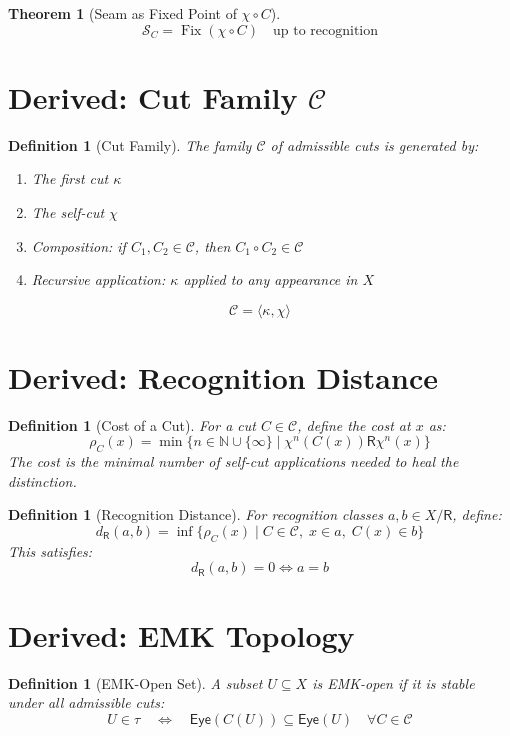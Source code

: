 \documentclass[12pt]{article}
\newtheorem{definition}[axiom]{Definition}
\newtheorem{theorem}[axiom]{Theorem}
\newcommand{\cut}{\kappa}
\newcommand{\selfcut}{\chi}
\newcommand{\seam}{\mathcal{S}}
\newcommand{\eye}{\mathsf{Eye}}
\newcommand{\rec}{\mathsf{R}}
\newcommand{\cost}{\rho}
\newcommand{\dist}{d_{\rec}}
\DeclareMathOperator{\Fix}{Fix}
\begin{document}
\begin{theorem}[Seam as Fixed Point of $\selfcut \circ C$]
\[
\seam_C = \Fix(\selfcut \circ C) \quad \text{up to recognition}
\]
\end{theorem}

\section{Derived: Cut Family $\mathcal{C}$}

\begin{definition}[Cut Family]
The family $\mathcal{C}$ of admissible cuts is generated by:
\begin{enumerate}
    \item The first cut $\cut$
    \item The self-cut $\selfcut$
    \item Composition: if $C_1, C_2 \in \mathcal{C}$, then $C_1 \circ C_2 \in \mathcal{C}$
    \item Recursive application: $\cut$ applied to any appearance in $X$
\end{enumerate}
\[
\mathcal{C} = \langle \cut, \selfcut \rangle
\]
\end{definition}

\section{Derived: Recognition Distance}

\begin{definition}[Cost of a Cut]
For a cut $C \in \mathcal{C}$, define the cost at $x$ as:
\[
\cost_C(x) = \min\{ n \in \mathbb{N} \cup \{\infty\} \mid \selfcut^n(C(x)) \rec \selfcut^n(x) \}
\]
The cost is the minimal number of self-cut applications needed to heal the distinction.
\end{definition}

\begin{definition}[Recognition Distance]
For recognition classes $a, b \in X/\rec$, define:
\[
\dist(a,b) = \inf\{ \cost_C(x) \mid C \in \mathcal{C},\; x \in a,\; C(x) \in b \}
\]
This satisfies:
\[
\dist(a,b) = 0 \iff a = b
\]
\end{definition}

\section{Derived: EMK Topology}

\begin{definition}[EMK-Open Set]
A subset $U \subseteq X$ is EMK-open if it is stable under all admissible cuts:
\[
U \in \tau \quad\Longleftrightarrow\quad \eye(C(U)) \subseteq \eye(U) \quad \forall C \in \mathcal{C}
\]
\end{definition}
\end{document}
